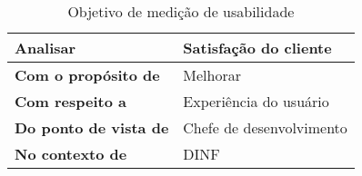 \begin{table}[H]
\centering
\begin{tabular}{|p{3cm}|p{6cm}|}
\hline
	\textbf{Analisar} &
  Satisfação do cliente
	\\ \hline
	\textbf{Com o propósito de} &
  Melhorar
	\\ \hline
	\textbf{Com respeito a} &
  Experiência do usuário
	\\ \hline
	\textbf{Do ponto de vista de} &
	Chefe de desenvolvimento
	\\ \hline
	\textbf{No contexto de} &
	DINF
	\\ \hline
\end{tabular}
\caption{Objetivo de medição de usabilidade}
\label{tab:objetivo_usabilidade}
\end{table}
